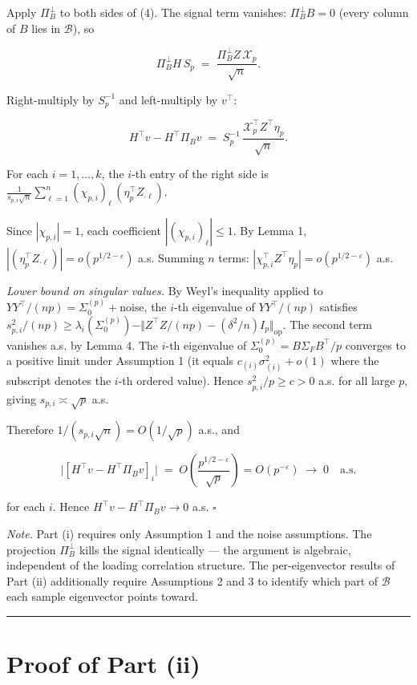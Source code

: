 \documentclass{article}
\theoremstyle{remark}
\begin{document}
Apply $\Pi_B^\perp$ to both sides of (4). The signal term vanishes: $\Pi_B^\perp B = 0$ (every column of $B$ lies in $\mathcal{B}$), so

\[
\Pi_B^\perp H\,S_p \;=\; \frac{\Pi_B^\perp Z\,\mathcal{X}_p}{\sqrt{n}}.
\]

Right-multiply by $S_p^{-1}$ and left-multiply by $v^\top$:

\[
H^\top v - H^\top\Pi_B v \;=\; S_p^{-1}\,\frac{\mathcal{X}_p^\top Z^\top \eta_p}{\sqrt{n}}. \tag{8}
\]

For each $i = 1,\ldots,k$, the $i$-th entry of the right side is $\frac{1}{s_{p,i}\sqrt{n}}\sum_{\ell=1}^n(\chi_{p,i})_\ell\,(\eta_p^\top Z_{\cdot\ell})$.

Since $|\chi_{p,i}| = 1$, each coefficient $|(\chi_{p,i})_\ell|\le 1$. By Lemma 1, $|(\eta_p^\top Z_{\cdot\ell})| = o(p^{1/2-\varepsilon})$ a.s. Summing $n$ terms: $|\chi_{p,i}^\top Z^\top\eta_p| = o(p^{1/2-\varepsilon})$ a.s.

\textit{Lower bound on singular values.} By Weyl's inequality applied to $YY^\top/(np) = \Sigma_0^{(p)} + \text{noise}$, the $i$-th eigenvalue of $YY^\top/(np)$ satisfies $s_{p,i}^2/(np) \ge \lambda_i(\Sigma_0^{(p)}) - \Vert Z^\top Z/(np) - (\delta^2/n)I_p\Vert_{\mathrm{op}}$. The second term vanishes a.s. by Lemma 4. The $i$-th eigenvalue of $\Sigma_0^{(p)} = B\Sigma_F B^\top/p$ converges to a positive limit under Assumption 1 (it equals $c_{(i)}\sigma_{(i)}^2 + o(1)$ where the subscript denotes the $i$-th ordered value). Hence $s_{p,i}^2/p \ge c > 0$ a.s. for all large $p$, giving $s_{p,i}\asymp\sqrt{p}$ a.s.

Therefore $1/(s_{p,i}\sqrt{n}) = O(1/\sqrt{p})$ a.s., and

\[
\bigl|[H^\top v - H^\top\Pi_B v]_i\bigr| \;=\; O\!\left(\frac{p^{1/2-\varepsilon}}{\sqrt{p}}\right) = O(p^{-\varepsilon}) \;\to\; 0 \quad\text{a.s.}
\]

for each $i$. Hence $H^\top v - H^\top\Pi_B v \to 0$ a.s. $\square$

\textit{Note.} Part (i) requires only Assumption 1 and the noise assumptions. The projection $\Pi_B^\perp$ kills the signal identically — the argument is algebraic, independent of the loading correlation structure. The per-eigenvector results of Part (ii) additionally require Assumptions 2 and 3 to identify which part of $\mathcal{B}$ each sample eigenvector points toward.

\medskip\noindent\rule{\linewidth}{0.4pt}\medskip

\section{Proof of Part (ii)}
\end{document}
